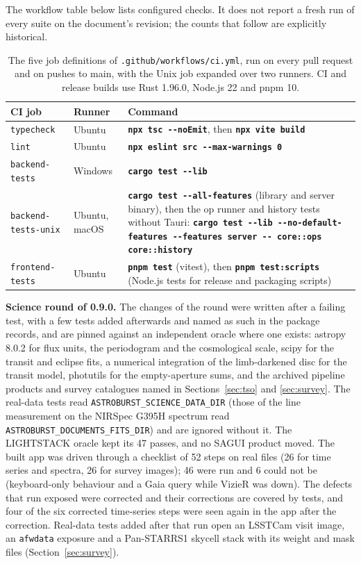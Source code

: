 \documentclass[11pt,a4paper]{article}
\newcommand{\code}[1]{\texttt{\small #1}}
\newcommand{\cmd}[1]{\texttt{\bfseries #1}}
\begin{document}
    The workflow table below lists configured checks. It does not report a fresh run of every suite on the document's revision; the counts that follow are explicitly historical.

    \begin{table}[H]
        \centering
        \small
        \begin{tabularx}{\textwidth}{llX}
            \toprule
            \textbf{CI job} & \textbf{Runner} & \textbf{Command} \\
            \midrule
            \code{typecheck} & Ubuntu & \cmd{npx tsc -{}-noEmit}, then \cmd{npx vite build} \\
            \code{lint} & Ubuntu & \cmd{npx eslint src -{}-max-warnings 0} \\
            \code{backend-tests} & Windows & \cmd{cargo test -{}-lib} \\
            \code{backend-tests-unix} & Ubuntu, macOS & \cmd{cargo test -{}-all-features} (library and server binary), then the op runner and history tests without Tauri: \cmd{cargo test -{}-lib -{}-no-default-features -{}-features server -{}- core::ops core::history} \\
            \code{frontend-tests} & Ubuntu & \cmd{pnpm test} (vitest), then \cmd{pnpm test:scripts} (Node.js tests for release and packaging scripts) \\
            \bottomrule
        \end{tabularx}
        \caption{The five job definitions of \code{.github/workflows/ci.yml}, run on every pull request and on pushes to main, with the Unix job expanded over two runners. CI and release builds use Rust 1.96.0, Node.js 22 and pnpm 10.}
    \end{table}

    \textbf{Science round of 0.9.0.} The changes of the round were written after a failing test, with a few tests added afterwards and named as such in the package records, and are pinned against an independent oracle where one exists: astropy 8.0.2 for flux units, the periodogram and the cosmological scale, scipy for the transit and eclipse fits, a numerical integration of the limb-darkened disc for the transit model, photutils for the empty-aperture sums, and the archived pipeline products and survey catalogues named in Sections~\ref{sec:tso} and \ref{sec:survey}. The real-data tests read \code{ASTROBURST\_SCIENCE\_DATA\_DIR} (those of the line measurement on the NIRSpec G395H spectrum read \code{ASTROBURST\_DOCUMENTS\_FITS\_DIR}) and are ignored without it. The LIGHTSTACK oracle kept its 47 passes, and no SAGUI product moved. The built app was driven through a checklist of 52 steps on real files (26 for time series and spectra, 26 for survey images); 46 were run and 6 could not be (keyboard-only behaviour and a Gaia query while VizieR was down). The defects that run exposed were corrected and their corrections are covered by tests, and four of the six corrected time-series steps were seen again in the app after the correction. Real-data tests added after that run open an LSSTCam visit image, an \code{afwdata} exposure and a Pan-STARRS1 skycell stack with its weight and mask files (Section~\ref{sec:survey}).
\end{document}
